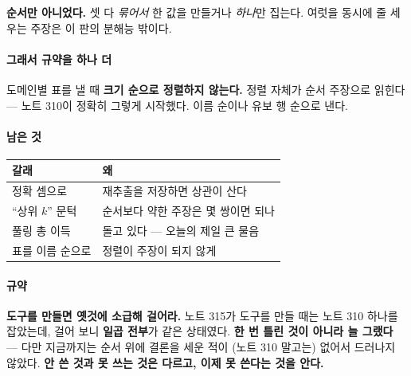 \documentclass[10pt]{article}
\begin{document}
\textbf{순서만 아니었다.} 셋 다 \emph{묶어서} 한 값을 만들거나 \emph{하나}만
집는다. 여럿을 동시에 줄 세우는 주장은 이 판의 분해능 밖이다.

\paragraph{그래서 규약을 하나 더} 도메인별 표를 낼 때 \textbf{크기 순으로
정렬하지 않는다.} 정렬 자체가 순서 주장으로 읽힌다 --- 노트 310이 정확히
그렇게 시작했다. 이름 순이나 유보 행 순으로 낸다.

\paragraph{남은 것}
\begin{center}\small
\begin{tabular}{ll}
\hline
갈래 & 왜 \\
\hline
정확 셈으로 & 재추출을 저장하면 상관이 산다 \\
``상위 $k$'' 문턱 & 순서보다 약한 주장은 몇 쌍이면 되나 \\
풀링 총 이득 & 돌고 있다 --- 오늘의 제일 큰 물음 \\
표를 이름 순으로 & 정렬이 주장이 되지 않게 \\
\hline
\end{tabular}
\end{center}

\paragraph{규약} \textbf{도구를 만들면 옛것에 소급해 걸어라.} 노트 315가
도구를 만들 때는 노트 310 하나를 잡았는데, 걸어 보니 \textbf{일곱 전부}가
같은 상태였다. \textbf{한 번 틀린 것이 아니라 늘 그랬다} --- 다만 지금까지는
순서 위에 결론을 세운 적이 (노트 310 말고는) 없어서 드러나지 않았다.
\textbf{안 쓴 것과 못 쓰는 것은 다르고, 이제 못 쓴다는 것을 안다.}
\end{document}
